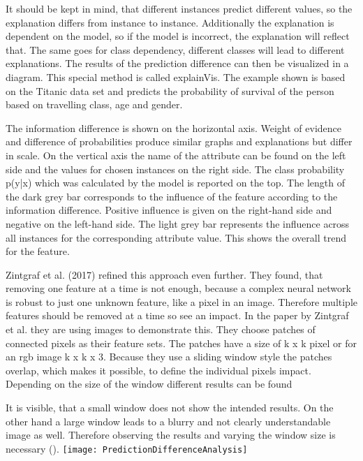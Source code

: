 It should be kept in mind, that different instances predict different values, so the explanation differs from instance to instance. Additionally the explanation is dependent on the model, so if the model is incorrect, the explanation will reflect that. The same goes for class dependency, different classes will lead to different explanations.
The results of the prediction difference can then be visualized in a diagram. This special method is called explainVis. The example shown is based on the Titanic data set and predicts the probability of survival of the person based on travelling class, age and gender.
\par
The information difference is shown on the horizontal axis. Weight of evidence and difference of probabilities produce similar graphs and explanations but differ in scale. On the vertical axis the name of the attribute can be found on the left side and the values for chosen instances on the right side. The class probability p(y|x) which was calculated by the model is reported on the top.
The length of the dark grey bar corresponds to the influence of the feature according to the information difference. Positive influence is given on the right-hand side and negative on the left-hand side. The light grey bar represents the influence across all instances for the corresponding attribute value. This shows the overall trend for the feature.
\par
Zintgraf et al. (2017) refined this approach even further. They found, that removing one feature at a time is not enough, because a complex neural network is robust to just one unknown feature, like a pixel in an image. Therefore multiple features should be removed at a time so see an impact. In the paper by Zintgraf et al. they are using images to demonstrate this. They choose patches of connected pixels as their feature sets. The patches have a size of k x k pixel or for an rgb image k x k x 3. Because they use a sliding window style the patches overlap, which makes it possible, to define the individual pixels impact. Depending on the size of the window different results can be found 
\par
It is visible, that a small window does not show the intended results. On the other hand a large window leads to a blurry and not clearly understandable image as well. Therefore observing the results and varying the window size is necessary (). 
\texttt{[image: PredictionDifferenceAnalysis]}

